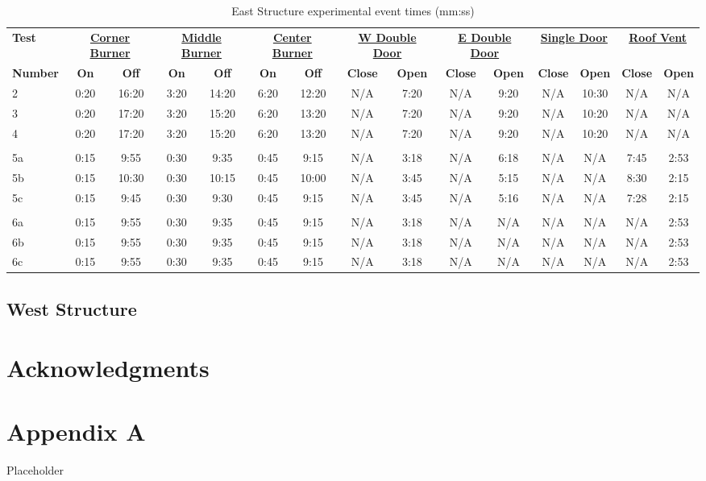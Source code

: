 \documentclass[12pt,oneside]{book}
\begin{document}
\begin{landscape}
\begin{table}[!ht]
\caption{East Structure experimental event times (mm:ss)}
\begin{tabular}{lcccccccccccccc}
 \toprule
\textbf{Test} & 
\multicolumn{2}{c}{\textbf{\underline{Corner Burner}}} & 
\multicolumn{2}{c}{\textbf{\underline{Middle Burner}}} & 
\multicolumn{2}{c}{\textbf{\underline{Center Burner}}} & 
\multicolumn{2}{c}{\textbf{\underline{W Double Door}}} & 
\multicolumn{2}{c}{\textbf{\underline{E Double Door}}} & 
\multicolumn{2}{c}{\textbf{\underline{Single Door}}} & 
\multicolumn{2}{c}{\textbf{\underline{Roof Vent}}}
\\
\textbf{Number} & 
\textbf{On} & \textbf{Off} & \textbf{On} & \textbf{Off} & \textbf{On} & \textbf{Off} & 
\textbf{Close} & \textbf{Open} & \textbf{Close} & \textbf{Open} &
\textbf{Close} & \textbf{Open} & \textbf{Close} & \textbf{Open}
\\
\midrule
2 & 0:20 & 16:20 & 3:20 & 14:20 & 6:20 & 12:20 & 
N/A & 7:20 & N/A & 9:20 & N/A & 10:30 & N/A & N/A \\
3 & 0:20 & 17:20 & 3:20 & 15:20 & 6:20 & 13:20 & 
N/A & 7:20 & N/A & 9:20 & N/A & 10:20 & N/A & N/A \\
4 & 0:20 & 17:20 & 3:20 & 15:20 & 6:20 & 13:20 & 
N/A & 7:20 & N/A & 9:20 & N/A & 10:20 & N/A & N/A 
\\ \multicolumn{15}{c}{ } \\
5a & 0:15 & 9:55 & 0:30 & 9:35 & 0:45 & 9:15 & 
N/A & 3:18 & N/A & 6:18 & N/A & N/A & 7:45 & 2:53 \\
5b & 0:15 & 10:30 & 0:30 & 10:15 & 0:45 & 10:00 & 
N/A & 3:45 & N/A & 5:15 & N/A & N/A & 8:30 & 2:15 \\
5c & 0:15 & 9:45 & 0:30 & 9:30 & 0:45 & 9:15 & 
N/A & 3:45 & N/A & 5:16 & N/A & N/A & 7:28 & 2:15
\\ \multicolumn{15}{c}{ } \\
6a & 0:15 & 9:55 & 0:30 & 9:35 & 0:45 & 9:15 & 
N/A & 3:18 & N/A & N/A & N/A & N/A & N/A & 2:53 \\
6b & 0:15 & 9:55 & 0:30 & 9:35 & 0:45 & 9:15 & 
N/A & 3:18 & N/A & N/A & N/A & N/A & N/A & 2:53 \\
6c & 0:15 & 9:55 & 0:30 & 9:35 & 0:45 & 9:15 & 
N/A & 3:18 & N/A & N/A & N/A & N/A & N/A & 2:53 \\
\bottomrule
\end{tabular}
\label{table:east_exp_times}
\end{table}
\end{landscape}

\section{West Structure}
\label{sec:West_exps}

\chapter{Acknowledgments}
\label{chap:Acknowledgments}



\appendix

\chapter{Appendix A}

Placeholder
\end{document}
